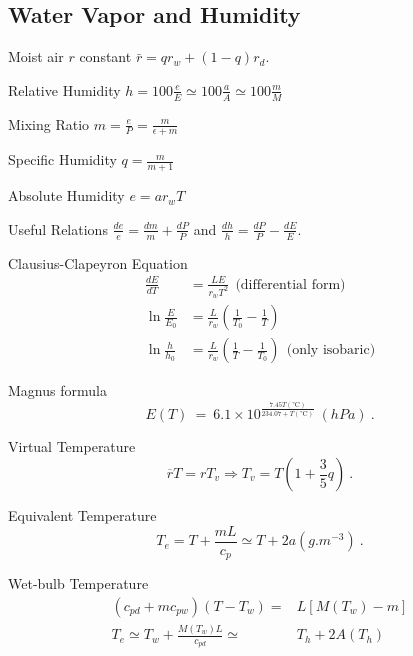 \documentclass[10pt]{article}
\newcommand{\gc}{\degreeCelsius}
\begin{document}
\begin{multicols}{3}
\section{Water Vapor and Humidity}
\begin{ttdesc}[labelwidth=\widthof{\ttfamily{letterpaper/a4paper}}]
\item[Moist air $r$ constant] $\bar r = q r_w + (1-q) r_d$.
\item[Relative Humidity] $h = 100\frac{e}{E}\simeq 100 \frac{a}{A} \simeq 100 \frac{m}{M}$
\item[Mixing Ratio] $m = \frac e P = \frac m {\epsilon + m}$
\item[Specific Humidity] $q=\frac m {m+1}$
\item[Absolute Humidity] $e = a r_w T$
\item[Useful Relations]  $\frac{de}{e}=\frac{dm}{m}+\frac{dP}{P}$ and
 $\frac{dh}{h}=\frac{dP}{P}-\frac{dE}{E}$.
\item[Clausius-Clapeyron Equation]
\begin{align*}
\frac{dE}{dT} &= \frac {L E}{r_w T^2} ~~\text{(differential form)} \\
\ln\frac E {E_0} &= \frac L {r_w} \left(\frac 1 {T_0} - \frac 1 T \right)\\
\ln\frac h {h_0} &= \frac L {r_w} \left(\frac 1 T - \frac 1 {T_0}\right) ~~\text{(only isobaric)}
\end{align*}
\item[Magnus formula] 
\begin{displaymath}
E(T) \ = \ 6.1 \times 10^{\displaystyle \frac{7.45  T(\si{\gc})}{234.07 + T(\si{\gc})}} \ (\si{hPa}) \ . 
\end{displaymath}
\item[Virtual Temperature] 
\begin{displaymath}
\overline{r} T= r T_v \Rightarrow T_v=T \left( 1 + \frac 3 5 q \right)~.
\end{displaymath}
\item[Equivalent Temperature] 
\begin{displaymath}
T_e=T+\frac{m L}{c_p} \simeq T + 2 a \left( \si{g.m^{-3}} \right)~.
\end{displaymath}
\item[Wet-bulb Temperature]
\begin{align*} 
  (c_{pd}+m c_{pw}) (T-T_w) =& L [M(T_w)-m] \nonumber \\
T_e \simeq T_w + \frac{M(T_w) L}{c_{pd}} \simeq& T_h + 2 A(T_h)
\end{align*}
\end{ttdesc}
%

\end{multicols}
\end{document}

